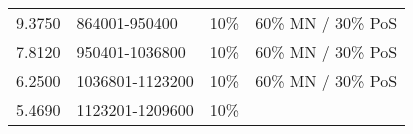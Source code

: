 \documentclass[11pt,a4paperpaper,]{report}
\begin{document}
\begin{longtable}[c]{@{}llll@{}}
\begin{minipage}[t]{0.12\columnwidth}\raggedright\strut
9.3750
\strut\end{minipage} &
\begin{minipage}[t]{0.22\columnwidth}\raggedright\strut
864001-950400
\strut\end{minipage} &
\begin{minipage}[t]{0.15\columnwidth}\raggedright\strut
10\%
\strut\end{minipage} &
\begin{minipage}[t]{0.27\columnwidth}\raggedright\strut
60\% MN / 30\% PoS
\strut\end{minipage}\tabularnewline
\begin{minipage}[t]{0.12\columnwidth}\raggedright\strut
7.8120
\strut\end{minipage} &
\begin{minipage}[t]{0.22\columnwidth}\raggedright\strut
950401-1036800
\strut\end{minipage} &
\begin{minipage}[t]{0.15\columnwidth}\raggedright\strut
10\%
\strut\end{minipage} &
\begin{minipage}[t]{0.27\columnwidth}\raggedright\strut
60\% MN / 30\% PoS
\strut\end{minipage}\tabularnewline
\begin{minipage}[t]{0.12\columnwidth}\raggedright\strut
6.2500
\strut\end{minipage} &
\begin{minipage}[t]{0.22\columnwidth}\raggedright\strut
1036801-1123200
\strut\end{minipage} &
\begin{minipage}[t]{0.15\columnwidth}\raggedright\strut
10\%
\strut\end{minipage} &
\begin{minipage}[t]{0.27\columnwidth}\raggedright\strut
60\% MN / 30\% PoS
\strut\end{minipage}\tabularnewline
\begin{minipage}[t]{0.12\columnwidth}\raggedright\strut
5.4690
\strut\end{minipage} &
\begin{minipage}[t]{0.22\columnwidth}\raggedright\strut
1123201-1209600
\strut\end{minipage} &
\begin{minipage}[t]{0.15\columnwidth}\raggedright\strut
10\%
\strut\end{minipage} &
\begin{minipage}[t]{0.27\columnwidth}\raggedright\strut

\end{minipage}
\end{longtable}
\end{document}
